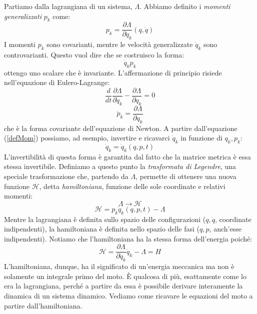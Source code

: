 \documentclass[a4paper,openany]{article}
\begin{document}
	Partiamo dalla lagrangiana di un sistema, $\Lambda$. Abbiamo definito i \textit{momenti generalizzati} $p_k$ come:
	\begin{equation}
		p_{k} = \dfrac{\partial \Lambda}{\partial \dot{q}_k}(q,\dot{q})
		\label{defMom}
	\end{equation}
	I momenti $p_k$ sono covarianti, mentre le velocità generalizzate $\dot{q}_k$ sono controvarianti. Questo vuol dire che se costruisco la forma:
	$$
	\dot{q}_k p_k
	$$
	ottengo uno scalare che è invariante. L'affermazione di principio risiede nell'equazione di Eulero-Lagrange:
	\begin{equation}\label{key}
		\dfrac{d}{dt} \dfrac{\partial \Lambda}{\partial \dot{q}_k} - \dfrac{\partial \Lambda}{\partial q_k} = 0
	\end{equation}
	$$
	\dot{p}_k = \dfrac{\partial \Lambda}{\partial q_k}
	$$
	che è la forma covariante dell'equazione di Newton. A partire dall'equazione (\ref{defMom}) possiamo, ad esempio, invertire e ricavarci $\dot{q}_k$ in funzione di $q_k,p_k$:
	$$
	\dot{q}_k = \dot{q}_k (q,p,t)
	$$
	L'invertibilità di questa forma è garantita dal fatto che la matrice metrica è essa stessa invertibile. Definiamo a questo punto la \textit{trasformata di Legendre}, una speciale trasformazione che, partendo da $\Lambda$, permette di ottenere una nuova funzione $\mathcal{H}$, detta \textit{hamiltoniana}, funzione delle sole coordinate e relativi momenti:
	\begin{equation}\label{key}
		\Lambda \rightarrow \mathcal{H}
	\end{equation}
	\begin{equation}\label{key}
		\mathcal{H} = p_{k}\dot{q}_k(q,p,t) - \Lambda 
	\end{equation}
	Mentre la lagrangiana è definita sullo spazio delle configurazioni ($q, \dot{q}$, coordinate indipendenti), la hamiltoniana è definita nello spazio delle fasi ($q,p$, anch'esse indipendenti). Notiamo che l'hamiltoniana ha la stessa forma dell'energia poiché:
	$$
	\mathcal{H} = \dfrac{\partial \Lambda}{\partial \dot{q}_k}\dot{q}_k - \Lambda = H 
	$$
	L'hamiltoniana, dunque, ha il significato di un'energia meccanica ma non è solamente un integrale primo del moto. È qualcosa di più, esattamente come lo era la lagrangiana, perché a partire da essa è possibile derivare interamente la dinamica di un sistema dinamico. Vediamo come ricavare le equazioni del moto a partire dall'hamiltoniana.
\end{document}
